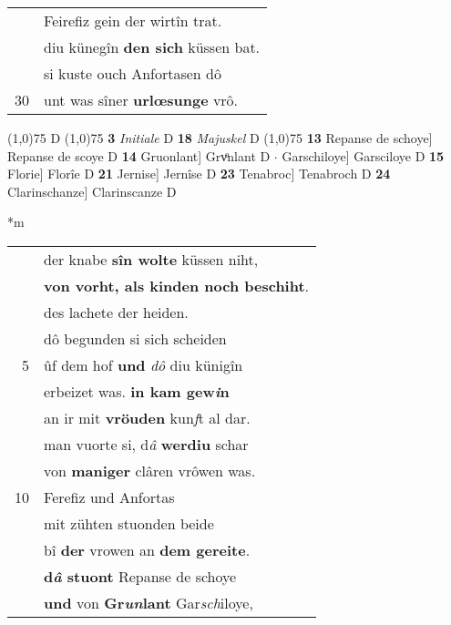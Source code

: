 \documentclass[8pt,a4paper,notitlepage]{article}
\begin{document}
\begin{table}[ht]
\begin{minipage}[t]{0.5\linewidth}
\begin{tabular}{rl}
 & Feirefiz gein der wirtîn trat.\\ 
 & diu künegîn \textbf{den sich} küssen bat.\\ 
 & si kuste ouch Anfortasen dô\\ 
30 & unt was sîner \textbf{urlœsunge} vrô.\\ 
\end{tabular}
\scriptsize
\line(1,0){75} \newline
D \newline
\line(1,0){75} \newline
\textbf{3} \textit{Initiale} D  \textbf{18} \textit{Majuskel} D  \newline
\line(1,0){75} \newline
\textbf{13} Repanse de schoye] Repanse de scoye D \textbf{14} Gruonlant] Grvͦnlant D  $\cdot$ Garschiloye] Garsciloye D \textbf{15} Florie] Florîe D \textbf{21} Jernise] Jernîse D \textbf{23} Tenabroc] Tenabroch D \textbf{24} Clarinschanze] Clarinscanze D \newline
\end{minipage}
\hspace{0.5cm}
\begin{minipage}[t]{0.5\linewidth}
\small
\begin{center}*m
\end{center}
\begin{tabular}{rl}
 & der knabe \textbf{sîn wolte} küssen niht,\\ 
 & \textbf{von vorht, als kinden noch beschiht}.\\ 
 & des lachete der heiden.\\ 
 & dô begunden si sich scheiden\\ 
5 & ûf dem hof \textbf{und} \textit{dô} diu künigîn\\ 
 & erbeizet was. \textbf{in kam gew\textit{i}n}\\ 
 & an ir mit \textbf{vröuden} kun\textit{f}t al dar.\\ 
 & man vuorte si, d\textit{â} \textbf{werdiu} schar\\ 
 & von \textbf{maniger} clâren vrôwen was.\\ 
10 & Ferefiz und Anfortas\\ 
 & mit zühten stuonden beide\\ 
 & bî \textbf{der} vrowen an \textbf{dem gereite}.\\ 
 & \textbf{d\textit{â} stuont} Repanse de schoye\\ 
 & \textbf{und} von \textbf{Gr\textit{un}lant} Gar\textit{sch}iloye,\\ 

\end{tabular}
\end{minipage}
\end{table}
\end{document}
